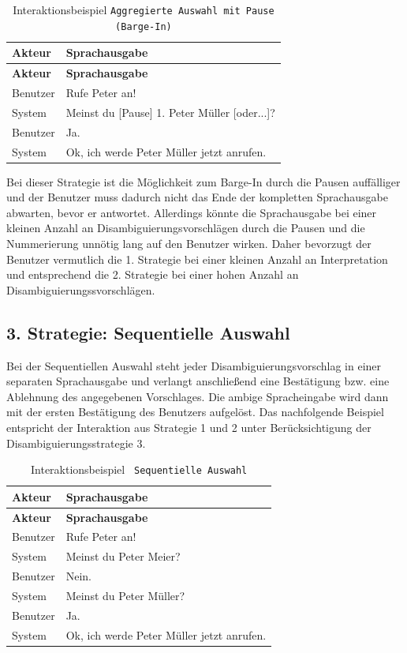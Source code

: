 \documentclass[12pt,a4paper]{scrartcl}
\begin{document}
\begin{longtable}{p{6cm}p{8cm}}
	\caption[Interaktionsbeispiel \texttt{Aggregierte Auswahl mit Pause (Barge-In)}]{Interaktionsbeispiel \texttt{Aggregierte Auswahl mit Pause (Barge-In)}}\\
	\hline
	\textbf{Akteur} &	\textbf{Sprachausgabe}\\
	\hline
	\endfirsthead
	\hline
	\textbf{Akteur} &	\textbf{Sprachausgabe}\\
	\hline
	\endhead
Benutzer & Rufe Peter an!\\
System & Meinst du [Pause] 1. Peter Müller [oder...]?\\
Benutzer & Ja.\\
System & Ok, ich werde Peter Müller jetzt anrufen.\\

\hline
\end{longtable}

Bei dieser Strategie ist die Möglichkeit zum Barge-In durch die Pausen auffälliger und der Benutzer muss dadurch nicht das Ende der kompletten Sprachausgabe abwarten, bevor er antwortet. Allerdings könnte die Sprachausgabe bei einer kleinen Anzahl an Disambiguierungsvorschlägen durch die Pausen und die Nummerierung unnötig lang auf den Benutzer wirken. Daher bevorzugt der Benutzer vermutlich die 1. Strategie bei einer kleinen Anzahl an Interpretation und entsprechend die 2. Strategie bei einer hohen Anzahl an Disambiguierungssvorschlägen.

\subsection{3. Strategie: Sequentielle Auswahl}
Bei der Sequentiellen Auswahl steht jeder Disambiguierungsvorschlag in einer separaten Sprachausgabe und verlangt anschließend eine Bestätigung bzw. eine Ablehnung des angegebenen Vorschlages. Die ambige Spracheingabe wird dann mit der ersten Bestätigung des Benutzers aufgelöst. Das nachfolgende Beispiel entspricht der Interaktion aus Strategie 1 und 2 unter Berücksichtigung der Disambiguierungsstrategie 3. 

\begin{longtable}{p{6cm}p{8cm}}
	\caption[Interaktionsbeispiel \texttt{Sequentielle Auswahl}]{Interaktionsbeispiel \texttt{ Sequentielle Auswahl}}\\
	\hline
	\textbf{Akteur} &	\textbf{Sprachausgabe}\\
	\hline
	\endfirsthead
	\hline
	\textbf{Akteur} &	\textbf{Sprachausgabe}\\
	\hline
	\endhead
Benutzer & Rufe Peter an!\\
System & Meinst du Peter Meier?\\
Benutzer & Nein.\\
System & Meinst du Peter Müller?\\
Benutzer & Ja.\\
System & Ok, ich werde Peter Müller jetzt anrufen.\\

\hline
\end{longtable}
\end{document}
